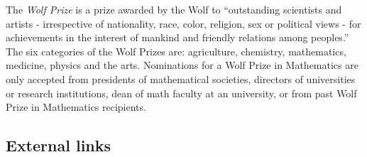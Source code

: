 \documentclass[12pt]{article}
\begin{document}
The {\em Wolf Prize} is a prize awarded by the Wolf  to ``outstanding scientists and artists - irrespective of nationality, race, color, religion, sex or political views - for achievements in the interest of mankind and friendly relations among peoples.'' The six categories of the Wolf Prizes are: agriculture, chemistry, mathematics, medicine, physics and the arts. Nominations for a Wolf Prize in Mathematics are only accepted from presidents of mathematical societies, directors of universities or research institutions, dean of math faculty at an university, or from past Wolf Prize in Mathematics recipients.

\subsection{External links}
\end{document}
